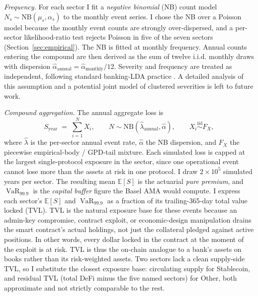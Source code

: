 \documentclass[runningheads]{llncs}
\newcommand{\E}{\mathbb{E}}
\newcommand{\VaR}{\operatorname{VaR}}
\newcommand{\NB}{\mathrm{NB}}
\begin{document}
\emph{Frequency.} For each sector I fit a \emph{negative binomial} (NB) count
model $N_s \sim \NB(\mu_s, \alpha_s)$ to the monthly event series.
I chose the NB over a Poisson model because the
monthly event counts are strongly over-dispersed, and a per-sector
likelihood-ratio test rejects Poisson in five of the seven sectors
(Section~\ref{sec:empirical}). The NB is fitted at monthly
frequency. Annual counts entering the compound are then derived as the sum of twelve
i.i.d. monthly draws with dispersion
$\hat\alpha_{\text{annual}}=\hat\alpha_{\text{monthly}}/12$. Severity
and frequency are treated as independent, following standard banking-LDA
practice \citep{Chernobai2008,Cope2009}. A detailed analysis of this assumption and a potential joint model of clustered
severities is left to future work.

\emph{Compound aggregation.} The annual aggregate loss is
\begin{equation}
S_{\text{year}} \;=\; \sum_{i=1}^{N} X_i,
\qquad N \sim \NB(\hat\lambda_{\text{annual}}, \hat\alpha),
\qquad X_i \overset{\text{iid}}{\sim} F_X,
\end{equation}
where $\hat\lambda$ is the per-sector annual event rate, $\hat\alpha$
the NB dispersion, and $F_X$ the piecewise empirical-body / GPD-tail
mixture. Each simulated loss is capped at the largest single-protocol
exposure in the sector, since one operational event cannot lose more
than the assets at risk in one protocol. I draw $2\times 10^5$
simulated years per sector. The resulting mean $\E[S]$ is the
actuarial \emph{pure premium}, and $\VaR_{99.9}$ is the \emph{capital buffer} figure the Basel
AMA would compute. I express each sector's $\E[S]$ and $\VaR_{99.9}$
as a fraction of its trailing-365-day total value locked (TVL). TVL is the
natural exposure base for these events because an admin-key compromise, contract
exploit, or economic-design manipulation drains the smart contract's actual
holdings, not just the collateral pledged against active positions. In other words, every
dollar locked in the contract at the moment of the exploit is at risk. TVL
is thus the on-chain analogue to a bank's assets on books rather than its
risk-weighted assets. Two sectors lack a clean supply-side TVL, so I substitute
the closest exposure base: circulating supply for Stablecoin, and residual TVL (total
DeFi minus the five named sectors) for Other, both approximate and not strictly
comparable to the rest.
\end{document}
